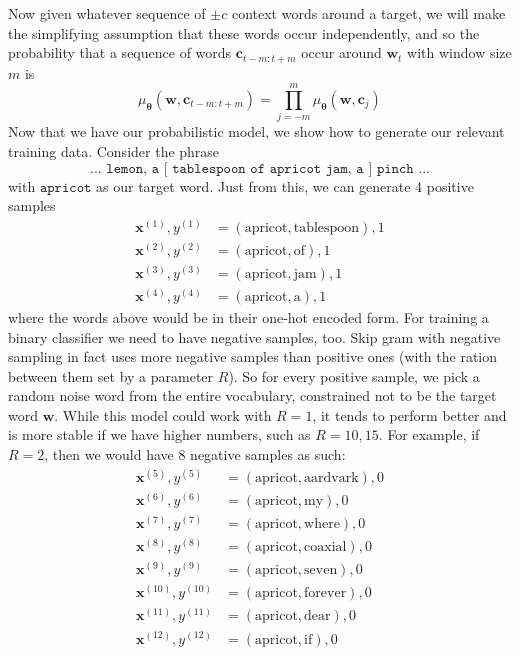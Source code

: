 \documentclass{article}
\begin{document}
      Now given whatever sequence of $\pm c$ context words around a target, we will make the simplifying assumption that these words occur independently, and so the probability that a sequence of words $\mathbf{c}_{t-m:t+m}$ occur around $\mathbf{w}_t$ with window size $m$ is 
      \[\mu_{\boldsymbol{\theta}} (\mathbf{w}, \mathbf{c}_{t-m:t+m}) = \prod_{j=-m}^m \mu_{\boldsymbol{\theta}} (\mathbf{w}, \mathbf{c}_j)\]
      Now that we have our probabilistic model, we show how to generate our relevant training data. Consider the phrase 
      \[\texttt{... lemon, a [ tablespoon of apricot jam, a ] pinch ...}\]
      with $\texttt{apricot}$ as our target word. Just from this, we can generate 4 positive samples 
      \begin{align*}
          \mathbf{x}^{(1)}, y^{(1)} & = (\text{apricot}, \text{tablespoon}), 1 \\
          \mathbf{x}^{(2)}, y^{(2)} & = (\text{apricot}, \text{of}), 1 \\
          \mathbf{x}^{(3)}, y^{(3)} & = (\text{apricot}, \text{jam}), 1 \\
          \mathbf{x}^{(4)}, y^{(4)} & = (\text{apricot}, \text{a}), 1 
      \end{align*}
      where the words above would be in their one-hot encoded form. For training a binary classifier we need to have negative samples, too. Skip gram with negative sampling in fact uses more negative samples than positive ones (with the ration between them set by a parameter $R$). So for every positive sample, we pick a random noise word from the entire vocabulary, constrained not to be the target word $\mathbf{w}$. While this model could work with $R = 1$, it tends to perform better and is more stable if we have higher numbers, such as $R = 10, 15$. For example, if $R = 2$, then we would have 8 negative samples as such: 
      \begin{align*}
          \mathbf{x}^{(5)}, y^{(5)} & = (\text{apricot}, \text{aardvark}), 0 \\
          \mathbf{x}^{(6)}, y^{(6)} & = (\text{apricot}, \text{my}), 0 \\
          \mathbf{x}^{(7)}, y^{(7)} & = (\text{apricot}, \text{where}), 0 \\
          \mathbf{x}^{(8)}, y^{(8)} & = (\text{apricot}, \text{coaxial}), 0 \\
          \mathbf{x}^{(9)}, y^{(9)} & = (\text{apricot}, \text{seven}), 0 \\
          \mathbf{x}^{(10)}, y^{(10)} & = (\text{apricot}, \text{forever}), 0 \\
          \mathbf{x}^{(11)}, y^{(11)} & = (\text{apricot}, \text{dear}), 0 \\
          \mathbf{x}^{(12)}, y^{(12)} & = (\text{apricot}, \text{if}), 0 
      \end{align*}
\end{document}
